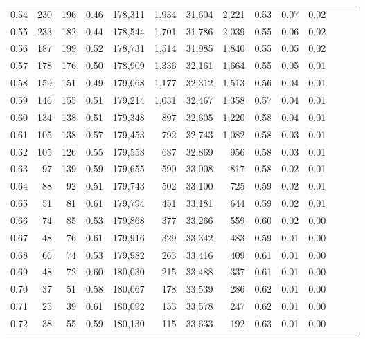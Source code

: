 \begin{tabular}{rrrrrrrrrrrrrr}
0.54 &    230 &    196 &  0.46 &  178,311 &    1,934 &  31,604 &   2,221 &  0.53 &  0.07 &      0.02 \\
0.55 &    233 &    182 &  0.44 &  178,544 &    1,701 &  31,786 &   2,039 &  0.55 &  0.06 &      0.02 \\
0.56 &    187 &    199 &  0.52 &  178,731 &    1,514 &  31,985 &   1,840 &  0.55 &  0.05 &      0.02 \\
0.57 &    178 &    176 &  0.50 &  178,909 &    1,336 &  32,161 &   1,664 &  0.55 &  0.05 &      0.01 \\
0.58 &    159 &    151 &  0.49 &  179,068 &    1,177 &  32,312 &   1,513 &  0.56 &  0.04 &      0.01 \\
0.59 &    146 &    155 &  0.51 &  179,214 &    1,031 &  32,467 &   1,358 &  0.57 &  0.04 &      0.01 \\
0.60 &    134 &    138 &  0.51 &  179,348 &      897 &  32,605 &   1,220 &  0.58 &  0.04 &      0.01 \\
0.61 &    105 &    138 &  0.57 &  179,453 &      792 &  32,743 &   1,082 &  0.58 &  0.03 &      0.01 \\
0.62 &    105 &    126 &  0.55 &  179,558 &      687 &  32,869 &     956 &  0.58 &  0.03 &      0.01 \\
0.63 &     97 &    139 &  0.59 &  179,655 &      590 &  33,008 &     817 &  0.58 &  0.02 &      0.01 \\
0.64 &     88 &     92 &  0.51 &  179,743 &      502 &  33,100 &     725 &  0.59 &  0.02 &      0.01 \\
0.65 &     51 &     81 &  0.61 &  179,794 &      451 &  33,181 &     644 &  0.59 &  0.02 &      0.01 \\
0.66 &     74 &     85 &  0.53 &  179,868 &      377 &  33,266 &     559 &  0.60 &  0.02 &      0.00 \\
0.67 &     48 &     76 &  0.61 &  179,916 &      329 &  33,342 &     483 &  0.59 &  0.01 &      0.00 \\
0.68 &     66 &     74 &  0.53 &  179,982 &      263 &  33,416 &     409 &  0.61 &  0.01 &      0.00 \\
0.69 &     48 &     72 &  0.60 &  180,030 &      215 &  33,488 &     337 &  0.61 &  0.01 &      0.00 \\
0.70 &     37 &     51 &  0.58 &  180,067 &      178 &  33,539 &     286 &  0.62 &  0.01 &      0.00 \\
0.71 &     25 &     39 &  0.61 &  180,092 &      153 &  33,578 &     247 &  0.62 &  0.01 &      0.00 \\
0.72 &     38 &     55 &  0.59 &  180,130 &      115 &  33,633 &     192 &  0.63 &  0.01 &      0.00 \\

\end{tabular}
